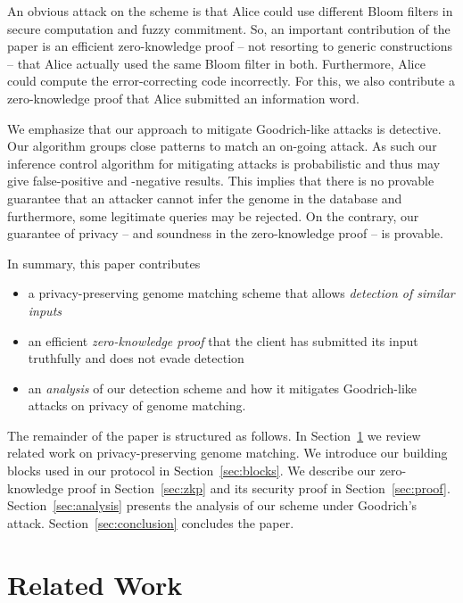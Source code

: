 \documentclass{llncs}
\begin{document}
An obvious attack on the scheme is that Alice could use different Bloom filters in secure computation and fuzzy commitment.
So, an important contribution of the paper is an efficient zero-knowledge proof -- not resorting to generic constructions -- that Alice actually used the same Bloom filter in both.
Furthermore, Alice could compute the error-correcting code incorrectly.
For this, we also contribute a zero-knowledge proof that Alice submitted an information word.

We emphasize that our approach to mitigate Goodrich-like attacks is detective.
Our algorithm groups close patterns to match an on-going attack.
As such our inference control algorithm for mitigating attacks is probabilistic and thus may give false-positive and -negative results.
This implies that there is no provable guarantee that an attacker cannot infer the genome in the database and furthermore, some legitimate queries may be rejected.
On the contrary, our guarantee of privacy -- and soundness in the zero-knowledge proof -- is provable.


In summary, this paper contributes
\begin{itemize}

\item a privacy-preserving genome matching scheme that allows {\em detection of similar inputs}

\item an efficient {\em zero-knowledge proof} that the client has submitted its input truthfully and does not evade detection

\item an {\em analysis} of our detection scheme and how it mitigates Goodrich-like attacks on privacy of genome matching.

\end{itemize}

The remainder of the paper is structured as follows.
In Section~\ref{sec:related} we review related work on privacy-preserving genome matching.
We introduce our building blocks used in our protocol in Section~\ref{sec:blocks}.
We describe our zero-knowledge proof in Section~\ref{sec:zkp} and its security proof in Section~\ref{sec:proof}.
Section~\ref{sec:analysis} presents the analysis of our scheme under Goodrich's attack.
Section~\ref{sec:conclusion} concludes the paper.

\section{Related Work}
\label{sec:related}
\end{document}
